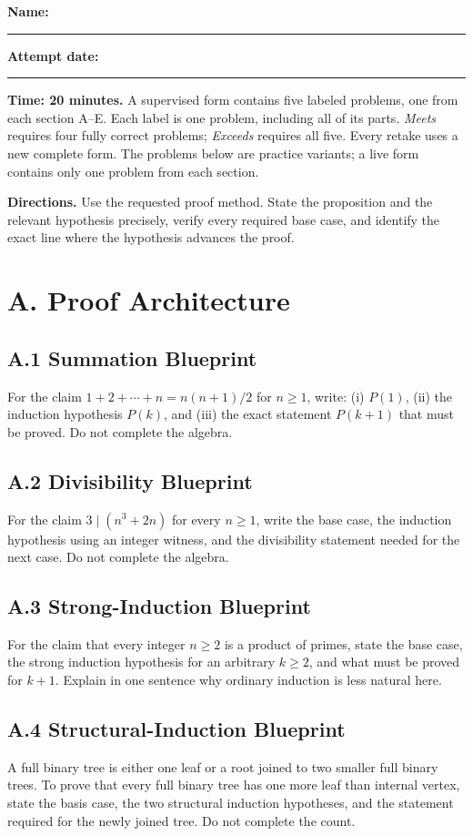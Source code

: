 \documentclass[11pt]{article}
\begin{document}
\textbf{Name:} \rule{3.2in}{0.4pt}\hfill
\textbf{Attempt date:} \rule{1.55in}{0.4pt}

\textbf{Time: 20 minutes.} A supervised form contains five labeled problems,
one from each section A--E. Each label is one problem, including all of its
parts. \emph{Meets} requires four fully correct problems; \emph{Exceeds}
requires all five. Every retake uses a new complete form. The problems below
are practice variants; a live form contains only one problem from each section.

\textbf{Directions.} Use the requested proof method. State the proposition and
the relevant hypothesis precisely, verify every required base case, and identify
the exact line where the hypothesis advances the proof.

\section*{A. Proof Architecture}

\subsection*{A.1 Summation Blueprint}
For the claim $1+2+\cdots+n=n(n+1)/2$ for $n\ge1$, write: (i) $P(1)$,
(ii) the induction hypothesis $P(k)$, and (iii) the exact statement $P(k+1)$
that must be proved. Do not complete the algebra.

\subsection*{A.2 Divisibility Blueprint}
For the claim $3\mid(n^3+2n)$ for every $n\ge1$, write the base case, the
induction hypothesis using an integer witness, and the divisibility statement
needed for the next case. Do not complete the algebra.

\subsection*{A.3 Strong-Induction Blueprint}
For the claim that every integer $n\ge2$ is a product of primes, state the base
case, the strong induction hypothesis for an arbitrary $k\ge2$, and what must
be proved for $k+1$. Explain in one sentence why ordinary induction is less
natural here.

\subsection*{A.4 Structural-Induction Blueprint}
A full binary tree is either one leaf or a root joined to two smaller full
binary trees. To prove that every full binary tree has one more leaf than
internal vertex, state the basis case, the two structural induction hypotheses,
and the statement required for the newly joined tree. Do not complete the count.
\end{document}
